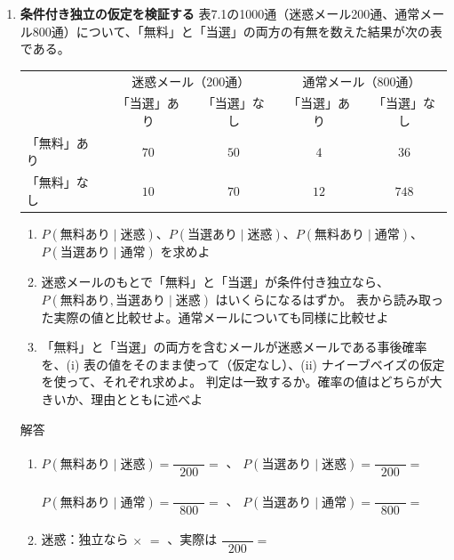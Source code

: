 \documentclass[a4paper,dvipdfmx]{jsarticle}
\newcommand{\提出期限}{2026年11月16日（月）}
\newcommand{\学籍番号}{0000000}
\newcommand{\氏名}{氏名を書く}
\newcommand{\提出日}{2026年11月16日}
\newenvironment{answer}{\begin{itembox}[l]{解答}}{\end{itembox}}
\begin{document}
\begin{enumerate}
  \item \textbf{条件付き独立の仮定を検証する}\quad
    表7.1の1000通（迷惑メール200通、通常メール800通）について、「無料」と「当選」の両方の有無を数えた結果が次の表である。
    \begin{center}
      \begin{tabular}{l|cc|cc}
        \hline
         & \multicolumn{2}{c|}{迷惑メール（200通）} & \multicolumn{2}{c}{通常メール（800通）} \\
         & 「当選」あり & 「当選」なし & 「当選」あり & 「当選」なし \\
        \hline
        「無料」あり & $70$ & $50$ & $4$ & $36$ \\
        「無料」なし & $10$ & $70$ & $12$ & $748$ \\
        \hline
      \end{tabular}
    \end{center}
    \begin{enumerate}
      \item $P(\text{無料あり} \mid \text{迷惑})$、$P(\text{当選あり} \mid \text{迷惑})$、$P(\text{無料あり} \mid \text{通常})$、$P(\text{当選あり} \mid \text{通常})$ を求めよ
      \item 迷惑メールのもとで「無料」と「当選」が条件付き独立なら、$P(\text{無料あり}, \text{当選あり} \mid \text{迷惑})$ はいくらになるはずか。
        表から読み取った実際の値と比較せよ。通常メールについても同様に比較せよ
      \item 「無料」と「当選」の両方を含むメールが迷惑メールである事後確率を、(i) 表の値をそのまま使って（仮定なし）、(ii) ナイーブベイズの仮定を使って、それぞれ求めよ。
        判定は一致するか。確率の値はどちらが大きいか、理由とともに述べよ
    \end{enumerate}
    \begin{answer}
      \begin{enumerate}
        \item $P(\text{無料あり} \mid \text{迷惑}) = \dfrac{\phantom{XXX}}{200} = $ \phantom{XXXX}、\quad
          $P(\text{当選あり} \mid \text{迷惑}) = \dfrac{\phantom{XXX}}{200} = $ \phantom{XXXX}
          \vspace{2mm}

          $P(\text{無料あり} \mid \text{通常}) = \dfrac{\phantom{XXX}}{800} = $ \phantom{XXXX}、\quad
          $P(\text{当選あり} \mid \text{通常}) = \dfrac{\phantom{XXX}}{800} = $ \phantom{XXXX}
          \vspace{4mm}
        \item 迷惑：独立なら \phantom{XXXX} $\times$ \phantom{XXXX} $= $ \phantom{XXXX}、実際は $\dfrac{\phantom{XXX}}{200} = $ \phantom{XXXX}
          \vspace{2mm}


\end{enumerate}
\end{answer}
\end{enumerate}
\end{document}
